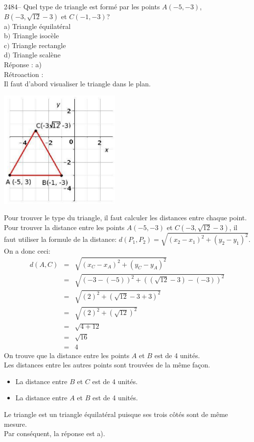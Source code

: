 \documentclass[letterpaper, 12pt]{article}
\begin{document}
2484-- Quel type de triangle est form\'e par les points $A(-5, -3)$, $B(-3, \sqrt{12}-3)$ et $C(-1, -3)$?\\

a$)$ Triangle \'equilat\'eral\\
b$)$ Triangle isoc\`ele\\
c$)$ Triangle rectangle\\
d$)$ Triangle scal\`ene\\

R\'eponse : a)\\

R\'etroaction :\\
Il faut d'abord visualiser le triangle dans le plan.
\begin{center}
 \includegraphics[width=6cm,bb=14 14 380 407]{Q2484.eps}
\end{center}
Pour trouver le type du triangle, il faut calculer les distances entre chaque point. \\
Pour trouver la distance entre les points $A(-5, -3)$ et $C(-3, \sqrt{12}-3)$, il faut utiliser la formule de la distance: $d(P_{1}, P_{2})=\sqrt{(x_{2}-x_{1})^{2}+(y_{2}-y_{1})^{2}}$. On a donc ceci:
\begin{eqnarray*}
 d(A, C)&=&\sqrt{(x_{C}-x_{A})^{2}+(y_{C}-y_{A})^{2}}\\
&=&\sqrt{(-3-(-5))^{2}+((\sqrt{12}-3)-(-3))^{2}}\\
&=&\sqrt{(2)^{2}+(\sqrt{12}-3+3)^{2}}\\
&=&\sqrt{(2)^{2}+(\sqrt{12})^{2}}\\
&=&\sqrt{4+12}\\
&=&\sqrt{16}\\
&=&4
\end{eqnarray*}
On trouve que la distance entre les points $A$ et $B$ est de 4 unit\'es.\\
Les distances entre les autres points sont trouv\'ees de la m\^eme fa\c con.
\begin{itemize}
 \item La distance entre $B$ et $C$ est de 4 unit\'es.
\item La distance entre $A$ et $B$ est de 4 unit\'es.\\
\end{itemize}
Le triangle est un triangle \'equilat\'eral puisque ses trois c\^ot\'es sont de m\^eme mesure. \\
Par cons\'equent, la r\'eponse est a).\\
\end{document}
